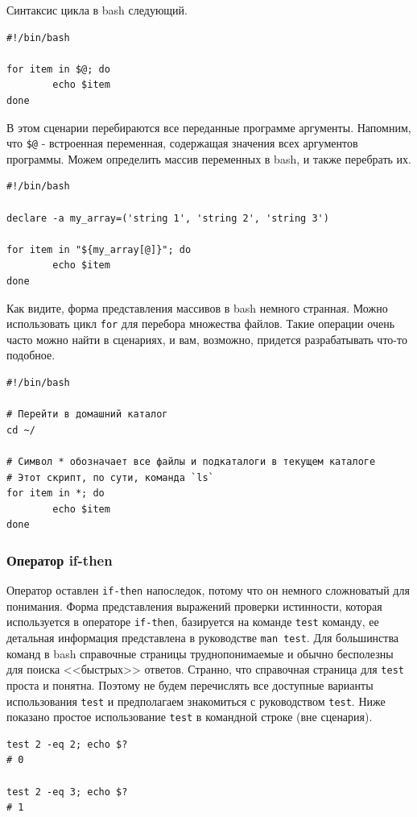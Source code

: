 \documentclass[12pt]{article}
\begin{document}
Синтаксис цикла в bash следующий.
\begin{verbatim}
#!/bin/bash

for item in $@; do
        echo $item
done
\end{verbatim}
В этом сценарии перебираются все переданные программе аргументы.
Напомним, что \texttt{\$@} - встроенная переменная, содержащая значения
всех аргументов программы. Можем определить массив переменных в bash, и
также перебрать их.
\begin{verbatim}
#!/bin/bash

declare -a my_array=('string 1', 'string 2', 'string 3')

for item in "${my_array[@]}"; do
        echo $item
done
\end{verbatim}
Как видите, форма представления массивов в bash немного странная. Можно
использовать цикл \texttt{for} для перебора множества файлов. Такие операции
очень часто можно найти в сценариях, и вам, возможно, придется
разрабатывать что-то подобное.
\begin{verbatim}
#!/bin/bash

# Перейти в домашний каталог
cd ~/

# Символ * обозначает все файлы и подкаталоги в текущем каталоге
# Этот скрипт, по сути, команда `ls`
for item in *; do
        echo $item
done
\end{verbatim}

\hypertarget{if-then-statements}{%
\subsubsection{\texorpdfstring{\protect\hyperlink{if-then-statements}{}Оператор
if-then}{Оператор if-then}}\label{if-then-statements}}

Оператор оставлен \texttt{if-then} напоследок, потому что он немного сложноватый
для понимания. Форма представления выражений проверки истинности, которая
используется в операторе \texttt{if-then}, базируется на команде \texttt{test}
команду, ее детальная информация представлена в руководстве
\texttt{man\ test}. Для большинства команд в bash справочные страницы
труднопонимаемые и обычно бесполезны для поиска <<быстрых>> ответов.
Странно, что справочная страница для \texttt{test} проста и понятна.
Поэтому не будем перечислять все доступные варианты использования
\texttt{test} и предполагаем знакомиться с руководством \texttt{test}. Ниже
показано простое использование \texttt{test} в командной строке (вне
сценария).
\begin{verbatim}
test 2 -eq 2; echo $?
# 0

test 2 -eq 3; echo $?
# 1
\end{verbatim}
\end{document}
